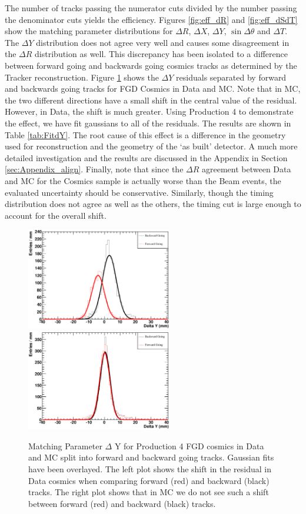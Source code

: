 The number of tracks passing the numerator cuts divided by the number passing the denominator cuts yields the efficiency. Figures \ref{fig:eff_dR} and \ref{fig:eff_dSdT} show the matching parameter distributions for $\Delta R$, $\Delta X$, $\Delta Y$, $\sin \Delta \theta$ and $\Delta T$. 
The $\Delta Y$ distribution does not agree very well and causes some disagreement in the $\Delta R$ distribution as well. This discrepancy has been isolated to a difference between forward going and backwards going cosmics tracks as determined by the Tracker reconstruction. Figure \ref{fig:dY} shows the $\Delta Y$ residuals separated by forward and backwards going tracks for FGD Cosmics in Data and MC. Note that in MC, the two different directions have a small shift in the central value of the residual. However, in Data, the shift is much greater. Using Production 4 to demonstrate the effect, we have fit gaussians to all of the residuals. The results are shown in Table \ref{tab:FitdY}. The root cause of this effect is a difference in the geometry used for reconstruction and the geometry of the `as built' detector. A much more detailed investigation and the results are discussed in the Appendix in Section \ref{sec:Appendix_align}. Finally, note that since the $\Delta R$ agreement between Data and MC for the Cosmics sample is actually worse than the Beam events, the evaluated uncertainty should be conservative. 
Similarly, though the timing distribution does not agree as well as the others, the timing cut is large enough to account for the overall shift. 


\begin{figure}
\centering
\includegraphics[width=2.5in]{Figures/Systematics/MatchingEfficiency/datadY.eps}
\includegraphics[width=2.5in]{Figures/Systematics/MatchingEfficiency/mcdY.eps}
\caption{
Matching Parameter $\Delta$ Y for Production 4 FGD cosmics in Data and MC split into forward and backward going tracks. Gaussian fits have been overlayed. The left plot shows the shift in the residual in Data cosmics when comparing forward (red) and backward (black) tracks. The right plot shows that in MC we do not see such a shift between forward (red) and backward (black) tracks.
}
\label{fig:dY}
\end{figure}

